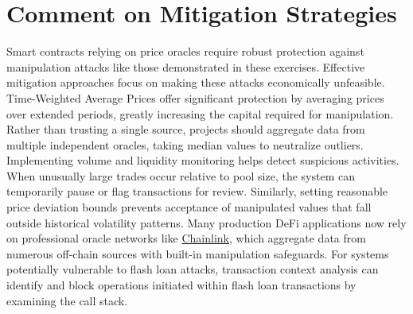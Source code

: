 \documentclass[12pt]{article}
\begin{document}
\section*{Comment on Mitigation Strategies}
Smart contracts relying on price oracles require robust protection against manipulation attacks like those demonstrated in these exercises. Effective mitigation approaches focus on making these attacks economically unfeasible.
Time-Weighted Average Prices offer significant protection by averaging prices over extended periods, greatly increasing the capital required for manipulation. Rather than trusting a single source, projects should aggregate data from multiple independent oracles, taking median values to neutralize outliers.
Implementing volume and liquidity monitoring helps detect suspicious activities. When unusually large trades occur relative to pool size, the system can temporarily pause or flag transactions for review. Similarly, setting reasonable price deviation bounds prevents acceptance of manipulated values that fall outside historical volatility patterns.
Many production DeFi applications now rely on professional oracle networks like \href{https://chain.link/}{Chainlink}, which aggregate data from numerous off-chain sources with built-in manipulation safeguards. For systems potentially vulnerable to flash loan attacks, transaction context analysis can identify and block operations initiated within flash loan transactions by examining the call stack.
\end{document}

